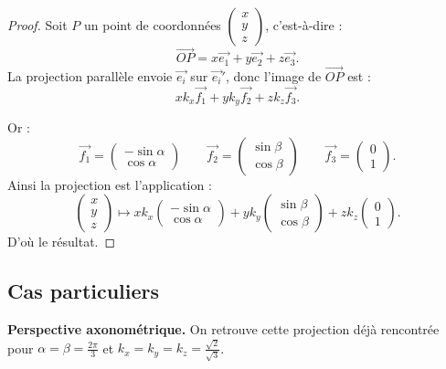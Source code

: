 \documentclass[11pt,class=report,crop=false]{standalone}
\begin{document}
\begin{proof}
Soit $P$ un point de coordonnées $\left(\begin{smallmatrix}x\\y\\z\end{smallmatrix}\right)$,
c'est-à-dire :
$$\overrightarrow{OP} = x\vec{e_1} + y\vec{e_2} + z \vec{e_3}.$$
La projection parallèle envoie $\vec{e_i}$ sur $\vec{e_i}'$, donc
l'image de $\overrightarrow{OP}$ est :
$$ x k_x \vec {f_1} + y k_y\vec {f_2} + z  k_z\vec {f_3}.$$

Or :
$$
\vec {f_1} = \begin{pmatrix}-\sin\alpha\\\cos\alpha\end{pmatrix}\qquad
\vec {f_2} = \begin{pmatrix}\sin\beta\\\cos\beta\end{pmatrix}\qquad
\vec {f_3} = \begin{pmatrix}0\\1\end{pmatrix}.
$$
Ainsi la projection est l'application :
$$\begin{pmatrix}x\\y\\z\end{pmatrix} \longmapsto 
x k_x\begin{pmatrix}-\sin\alpha\\\cos\alpha\end{pmatrix} 
+ y k_y\begin{pmatrix}\sin\beta\\\cos\beta\end{pmatrix}
+ z  k_z\begin{pmatrix}0\\1\end{pmatrix}.$$
D'où le résultat.
\end{proof}


\subsection{Cas particuliers}


\textbf{Perspective axonométrique.}
On retrouve cette projection déjà rencontrée pour $\alpha=\beta=\frac{2\pi}{3}$ et $k_x=k_y=k_z=\frac{\sqrt2}{\sqrt3}$.

\end{document}
